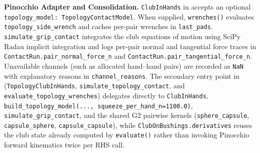 \documentclass[11pt,a4paper]{article}
\begin{document}
\textbf{Pinocchio Adapter and Consolidation.} \texttt{ClubInHands} in 
accepts an optional \texttt{topology\_model: TopologyContactModel}. When supplied, \texttt{wrenches()} evaluates \texttt{topology\_side\_wrench}
and caches per-pair wrenches in \texttt{last\_pads}. \texttt{simulate\_grip\_contact} integrates the club equations of motion using SciPy Radau
implicit integration and logs per-pair normal and tangential force traces in \texttt{ContactRun.pair\_normal\_force\_n} and
\texttt{ContactRun.pair\_tangential\_force\_n}. Unavailable channels (such as allocated hand--hand pairs) are recorded as \texttt{NaN} with
explanatory reasons in \texttt{channel\_reasons}. The secondary entry point in 
(\texttt{TopologyClubInHands}, \texttt{simulate\_topology\_contact}, and \texttt{evaluate\_topology\_wrenches}) delegates directly to
\texttt{ClubInHands}, \texttt{build\_topology\_model(..., squeeze\_per\_hand\_n=1100.0)}, \texttt{simulate\_grip\_contact}, and the shared G2
pairwise kernels (\texttt{sphere\_capsule}, \texttt{capsule\_sphere}, \texttt{capsule\_capsule}), while \texttt{ClubOnBushings.derivatives}
reuses the club state already computed by \texttt{evaluate()} rather than invoking Pinocchio forward kinematics twice per RHS call.
\end{document}
